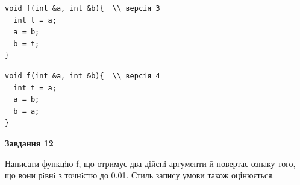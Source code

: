 \documentclass[12pt, ukrainian]{article}
\begin{document}
{\begin {large}
\begin{minipage}[t]{11.0cm}
\vspace{-8mm}\begin{verbatim}
void f(int &a, int &b){  \\ версія 3
  int t = a;
  a = b;
  b = t;
}
\end{verbatim}

\vspace{-8mm}\begin{verbatim}
void f(int &a, int &b){  \\ версія 4
  int t = a;
  a = b;
  b = a;
}
\end{verbatim}



\begin{center}
\textbf{Завдання 12}
\end{center}

Написати функцiю f, що отримує два дiйснi аргументи й повертає ознаку того, що вони рiвнi з точнiстю до 0.01. Стиль запису умови також оцінюється.\par

\end{minipage}

\end {large}}
\newpage
\end{document}
